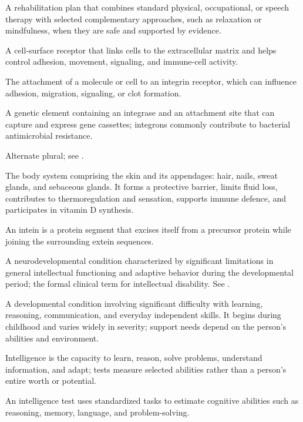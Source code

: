  A rehabilitation plan that combines standard physical, occupational, or speech therapy with selected complementary approaches, such as relaxation or mindfulness, when they are safe and supported by evidence.

 A cell-surface receptor that links cells to the extracellular matrix and helps control adhesion, movement, signaling, and immune-cell activity.

 The attachment of a molecule or cell to an integrin receptor, which can influence adhesion, migration, signaling, or clot formation.

 A genetic element containing an integrase and an attachment site that can capture and express gene cassettes; integrons commonly contribute to bacterial antimicrobial resistance.

 Alternate plural; see .

 The body system comprising the skin and its appendages: hair, nails, sweat glands, and
sebaceous glands. It forms a protective barrier, limits fluid loss, contributes to
thermoregulation and sensation, supports immune defence, and participates in vitamin D
synthesis.

 An intein is a protein segment that excises itself from a precursor protein while joining the surrounding extein sequences.

 A neurodevelopmental condition characterized by significant limitations in general intellectual functioning and adaptive behavior during the developmental period; the formal clinical term for intellectual disability. See .

 A developmental condition involving significant difficulty with learning, reasoning, communication, and everyday independent skills. It begins during childhood and varies widely in severity; support needs depend on the person’s abilities and environment.

 Intelligence is the capacity to learn, reason, solve problems, understand information, and adapt; tests measure selected abilities rather than a person’s entire worth or potential.

 An intelligence test uses standardized tasks to estimate cognitive abilities such as reasoning, memory, language, and problem-solving.

